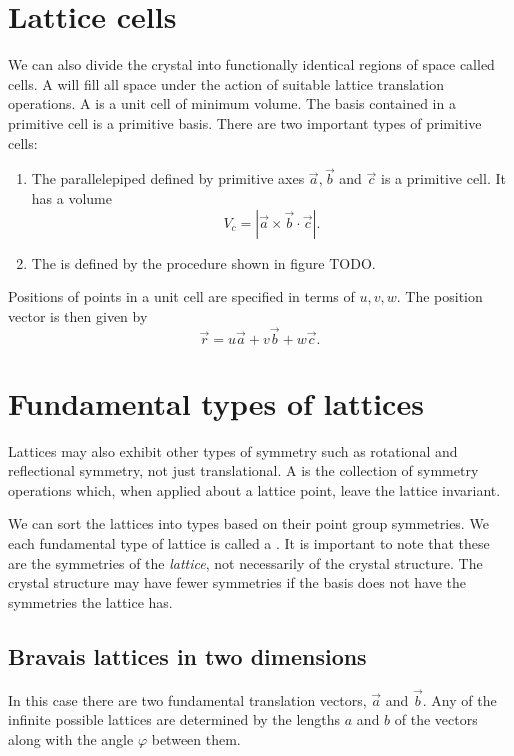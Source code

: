 \section{Lattice cells}
We can also divide the crystal into functionally identical regions of space called cells. A  will fill all space under the action of suitable lattice translation operations. A  is a unit cell of minimum volume. The basis contained in a primitive cell is a primitive basis. There are two important types of primitive cells:
\begin{enumerate}
\item The parallelepiped defined by primitive axes $\vec{a}, \vec{b}$ and $\vec{c}$ is a primitive cell. It has a volume
\[ V_c = |\vec{a}\times \vec{b} \cdot \vec{c}|. \]
\item The  is defined by the procedure shown in figure TODO.
\end{enumerate}

Positions of points in a unit cell are specified in terms of  $u, v, w$. The position vector is then given by
\[ \vec{r} = u \vec{a} + v \vec{b} + w \vec{c}. \] 

\section{Fundamental types of lattices}
Lattices may also exhibit other types of symmetry such as rotational and reflectional symmetry, not just translational. A  is the collection of symmetry operations  which, when applied about a lattice point, leave the lattice invariant.

We can sort the lattices into types based on their point group symmetries. We each fundamental type of lattice is called a . It is important to note that these are the symmetries of the \textit{lattice}, not necessarily of the crystal structure. The crystal structure may have fewer symmetries if the basis does not have the symmetries the lattice has.

\subsection{Bravais lattices in two dimensions}
In this case there are two fundamental translation vectors, $\vec{a}$ and $\vec{b}$. Any of the infinite possible lattices are determined by the lengths $a$ and $b$ of the vectors along with the angle $\varphi$ between them.


